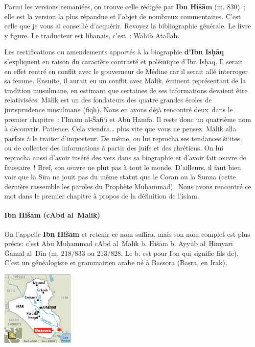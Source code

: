 Parmi les versions remaniées, on trouve celle rédigée par \textbf{Ibn
Hišām} (m. 830)~; elle est la version la plus répandue et l'objet de
nombreux commentaires. C'est celle que je vous ai conseillé d'acquérir.
Revoyez la bibliographie générale. Le livre y figure. Le traducteur est
libanais, c'est~: Wahib Atallah.

Les rectifications ou amendements apportés à la biographie \textbf{d'Ibn
Isḥāq} s'expliquent en raison du caractère contrasté et polémique d'Ibn
Isḥāq. Il serait en effet rentré en conflit avec le gouverneur de Médine
car il serait allé interroger sa femme. Ensuite, il aurait eu un conflit
avec Mālik, éminent représentant de la tradition musulmane, en estimant
que certaines de ses informations devaient être relativisées. Mālik est
un des fondateurs des quatre grandes écoles de jurisprudence musulmane
(fiqh). Nous en avons déjà rencontré deux~dans le premier chapitre~:
l'Imām al-Šāfi`ī et Abū Ḥanīfa. Il reste donc un quatrième nom à
découvrir. Patience. Cela viendra\ldots{} plus vite que vous ne pensez.
Mālik alla parfois à le traiter d'imposteur. De même, on lui reprocha
ses tendances ši`ites, ou de collecter des informations à partir des
juifs et des chrétiens. On lui reprocha aussi d'avoir inséré des vers
dans sa biographie et d'avoir fait œuvre de faussaire~! Bref, son œuvre
ne plut pas à tout le monde. D'ailleurs, il faut bien voir que la Sīra
ne jouit pas du même statut que le Coran ou la Sunna (cette dernière
rassemble les paroles du Prophète Muḥammad).~Nous avons rencontré ce mot
dans le premier chapitre à propos de la définition de l'islam.


\paragraph{Ibn Hišām (cAbd
al~Malik)}

On l'appelle \textbf{Ibn Hišām} et retenir ce nom suffira, mais son nom
complet est plus précis: c'est Abū Muḥammad cAbd al~Malik b. Hišām b.
Ayyūb al~Ḥimyarī Ǧamal al~Dīn (m. 218/833 ou 213/828. Le b. est pour Ibn
qui signifie fils de). C'est un généalogiste et grammairien arabe né à
Bassora (Baṣra, en Irak).

\begin{marginfigure}
\includegraphics[width=1.42033in,height=1.46065in]{Images/image040.png}
\end{marginfigure}
 


